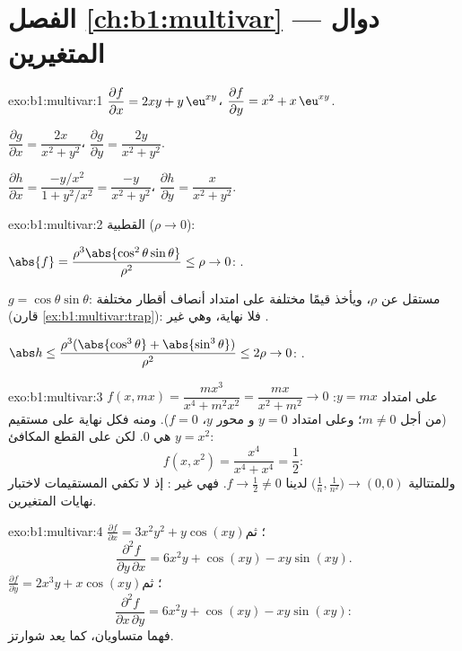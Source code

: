 \section*{الفصل \ref{ch:b1:multivar} --- دوال المتغيرين}

\begin{solution}{exo:b1:multivar:1}
$\dfrac{\partial f}{\partial x} = 2xy + y\,\eu^{xy}$،
$\dfrac{\partial f}{\partial y} = x^2 + x\,\eu^{xy}$.

$\dfrac{\partial g}{\partial x} = \dfrac{2x}{x^2+y^2}$،
$\dfrac{\partial g}{\partial y} = \dfrac{2y}{x^2+y^2}$.

$\dfrac{\partial h}{\partial x} = \dfrac{-y/x^2}{1 + y^2/x^2} =
\dfrac{-y}{x^2+y^2}$،
$\dfrac{\partial h}{\partial y} = \dfrac{x}{x^2+y^2}$.
\end{solution}

\begin{solution}{exo:b1:multivar:2}
 القطبية ($\rho \to 0$):

$\abs{f} = \dfrac{\rho^3\abs{\cos^2\theta\sin\theta}}{\rho^2} \leq
\rho \to 0$: .

$g = \cos\theta\sin\theta$: مستقل عن $\rho$، ويأخذ قيمًا
مختلفة على امتداد أنصاف أقطار مختلفة (قارن
\cref{ex:b1:multivar:trap}): فلا نهاية، وهي غير .

$\abs h \leq \dfrac{\rho^3(\abs{\cos^3\theta} +
\abs{\sin^3\theta})}{\rho^2} \leq 2\rho \to 0$: .
\end{solution}

\begin{solution}{exo:b1:multivar:3}
على امتداد $y = mx$: $f(x, mx) = \dfrac{m x^3}{x^4 + m^2 x^2} =
\dfrac{mx}{x^2 + m^2} \to 0$ (من أجل $m \neq 0$؛ وعلى امتداد $y = 0$ و
محور $y$، $f = 0$). ومنه فكل نهاية على مستقيم هي $0$. لكن على
القطع المكافئ $y = x^2$:
\[
f(x, x^2) = \frac{x^4}{x^4 + x^4} = \frac12 :
\]
وللمتتالية $\bigl(\frac1n, \frac{1}{n^2}\bigr) \to (0,0)$ لدينا
$f \to \frac12 \neq 0$. فهي غير : إذ لا تكفي المستقيمات
لاختبار نهايات المتغيرين.
\end{solution}

\begin{solution}{exo:b1:multivar:4}
$\frac{\partial f}{\partial x} = 3x^2y^2 + y\cos(xy)$؛ ثم
\[
\frac{\partial^2 f}{\partial y\,\partial x}
= 6x^2 y + \cos(xy) - xy\sin(xy) .
\]
$\frac{\partial f}{\partial y} = 2x^3 y + x\cos(xy)$؛ ثم
\[
\frac{\partial^2 f}{\partial x\,\partial y}
= 6x^2 y + \cos(xy) - xy\sin(xy) :
\]
فهما متساويان، كما يعد شوارتز.
\end{solution}

